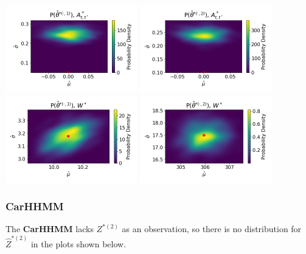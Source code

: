 \documentclass[12pt]{TD-CJS}
\begin{document}
\includegraphics[width=2.25in]{../Plots/hhmm_FV_uncorr_MLE_density_A_0_0.png}
\includegraphics[width=2.25in]{../Plots/hhmm_FV_uncorr_MLE_density_A_0_1.png}
\includegraphics[width=2.25in]{../Plots/hhmm_FV_uncorr_MLE_density_FoVeDBA_0_0.png}
\includegraphics[width=2.25in]{../Plots/hhmm_FV_uncorr_MLE_density_FoVeDBA_0_1.png}


\newpage
\subsubsection{\textbf{CarHHMM}}

The \textbf{CarHHMM} lacks $Z^{*(2)}$ as an observation, so there is no distribution for $\hat Z^{*(2)}$ in the plots shown below.
\end{document}
